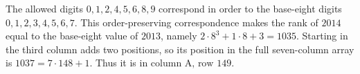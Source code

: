 The allowed digits $0,1,2,4,5,6,8,9$ correspond in order to the base-eight digits $0,1,2,3,4,5,6,7$. This order-preserving correspondence makes the rank of $2014$ equal to the base-eight value of $2013$, namely $2\cdot8^3+1\cdot8+3=1035$. Starting in the third column adds two positions, so its position in the full seven-column array is $1037=7\cdot148+1$. Thus it is in $\boxed{\text{column A, row 149}}$.
